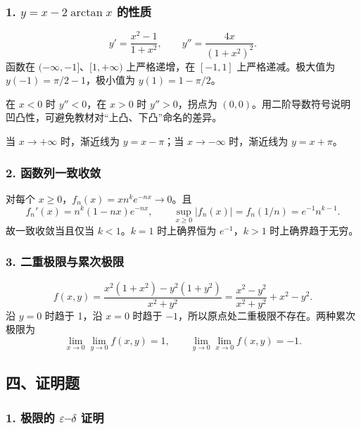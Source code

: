 \documentclass[11pt,fontset=fandol]{ctexart}
\begin{document}
\subsubsection{\texorpdfstring{1. \(y=x-2\arctan x\)
的性质}{1. y=x-2\textbackslash arctan x 的性质}}\label{yx-2arctan-x-ux7684ux6027ux8d28}

\[
y'=\frac{x^2-1}{1+x^2},\qquad y''=\frac{4x}{(1+x^2)^2}.
\] 函数在 \((-\infty,-1]\)、\([1,+\infty)\) 上严格递增，在 \([-1,1]\)
上严格递减。极大值为 \(y(-1)=\pi/2-1\)，极小值为 \(y(1)=1-\pi/2\)。

在 \(x<0\) 时 \(y''<0\)，在 \(x>0\) 时 \(y''>0\)，拐点为
\((0,0)\)。用二阶导数符号说明凹凸性，可避免教材对``上凸、下凸''命名的差异。

当 \(x\to+\infty\) 时，渐近线为 \(y=x-\pi\)；当 \(x\to-\infty\)
时，渐近线为 \(y=x+\pi\)。

\subsubsection{2.
函数列一致收敛}\label{ux51fdux6570ux5217ux4e00ux81f4ux6536ux655b}

对每个 \(x\geq0\)，\(f_n(x)=xn^ke^{-nx}\to0\)。且 \[
f_n'(x)=n^k(1-nx)e^{-nx},\qquad
\sup_{x\geq0}|f_n(x)|=f_n(1/n)=e^{-1}n^{k-1}.
\] 故一致收敛当且仅当 \(\boxed{k<1}\)。\(k=1\) 时上确界恒为
\(e^{-1}\)，\(k>1\) 时上确界趋于无穷。

\subsubsection{3.
二重极限与累次极限}\label{ux4e8cux91cdux6781ux9650ux4e0eux7d2fux6b21ux6781ux9650}

\[
f(x,y)=\frac{x^2(1+x^2)-y^2(1+y^2)}{x^2+y^2}
=\frac{x^2-y^2}{x^2+y^2}+x^2-y^2.
\] 沿 \(y=0\) 时趋于 1，沿 \(x=0\) 时趋于
\(-1\)，所以原点处二重极限不存在。两种累次极限为 \[
\boxed{\lim_{x\to0}\lim_{y\to0}f(x,y)=1,\qquad
\lim_{y\to0}\lim_{x\to0}f(x,y)=-1.}
\]

\subsection{四、证明题}\label{ux56dbux8bc1ux660eux9898}

\subsubsection{\texorpdfstring{1. 极限的 \(\varepsilon\)--\(\delta\)
证明}{1. 极限的 \textbackslash varepsilon--\textbackslash delta 证明}}\label{ux6781ux9650ux7684-varepsilondelta-ux8bc1ux660e}
\end{document}
